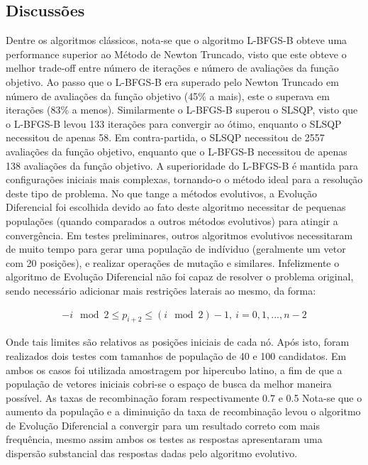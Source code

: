 \documentclass{article}
\begin{document}
\subsection{Discussões}
Dentre os algoritmos clássicos, nota-se que o algoritmo L-BFGS-B obteve uma performance superior ao Método de Newton Truncado, visto que este obteve o melhor trade-off entre número de iterações e número de avaliações da função objetivo. Ao passo que o L-BFGS-B era superado pelo Newton Truncado em número de avaliações da função objetivo (45\% a mais), este o superava em iterações (83\% a menos). Similarmente o L-BFGS-B superou o SLSQP, visto que o L-BFGS-B levou 133 iterações para convergir ao ótimo, enquanto o SLSQP necessitou de apenas 58. Em contra-partida, o SLSQP necessitou de 2557 avaliações da função objetivo, enquanto que o L-BFGS-B necessitou de apenas 138 avaliações da função objetivo.\newline
A superioridade do L-BFGS-B é mantida para configurações iniciais mais complexas, tornando-o o método ideal para a resolução deste tipo de problema.\newline
No que tange a métodos evolutivos, a Evolução Diferencial foi escolhida devido ao fato deste algoritmo necessitar de pequenas populações (quando comparados a outros métodos evolutivos) para atingir a convergência. Em testes preliminares, outros algoritmos evolutivos necessitaram de muito tempo para gerar uma população de indíviduo (geralmente um vetor com 20 posições), e realizar operações de mutação e similares. Infelizmente o algoritmo de Evolução Diferencial não foi capaz de resolver o problema original, sendo necessário adicionar mais restrições laterais ao mesmo, da forma:

\begin{equation}
\begin{split}
-i \mod 2 \leq p_{i+2} \leq (i \mod 2) -1 ,\ i = 0, 1, ..., n-2
\end{split}
\end{equation}

Onde tais limites são relativos as posições iniciais de cada nó. Após isto, foram realizados dois testes com tamanhos de população de 40 e 100 candidatos. Em ambos os casos foi utilizada amostragem por hipercubo latino, a fim de que a população de vetores iniciais cobri-se o espaço de busca da melhor maneira possível. As taxas de recombinação foram respectivamente 0.7 e 0.5\newline
Nota-se que o aumento da população e a diminuição da taxa de recombinação levou o algoritmo de Evolução Diferencial a convergir para um resultado correto com mais frequência, mesmo assim ambos os testes as respostas apresentaram uma dispersão substancial das respostas dadas pelo algoritmo evolutivo.
\end{document}

